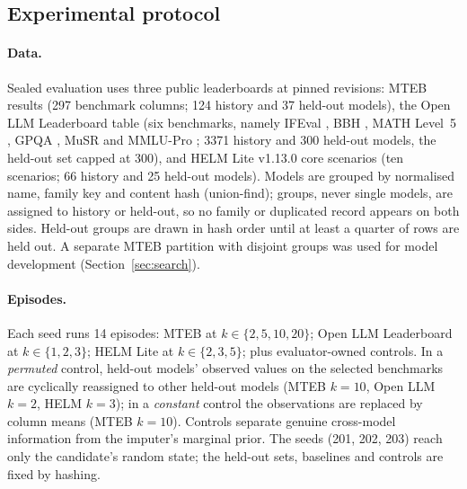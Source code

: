 \documentclass{article}
\begin{document}
\subsection{Experimental protocol}\label{sec:protocol}
\paragraph{Data.} Sealed evaluation uses three public leaderboards at pinned revisions: MTEB results (297 benchmark columns; 124 history and 37 held-out models), the Open LLM Leaderboard table (six benchmarks, namely IFEval \citep{Zhou2023IFEval}, BBH \citep{Suzgun2023BBH}, MATH Level~5 \citep{Hendrycks2021MATH}, GPQA \citep{Rein2023GPQA}, MuSR \citep{Sprague2023MuSR} and MMLU-Pro \citep{Wang2024MMLUPro}; 3371 history and 300 held-out models, the held-out set capped at 300), and HELM Lite v1.13.0 core scenarios (ten scenarios; 66 history and 25 held-out models). Models are grouped by normalised name, family key and content hash (union-find); groups, never single models, are assigned to history or held-out, so no family or duplicated record appears on both sides. Held-out groups are drawn in hash order until at least a quarter of rows are held out. A separate MTEB partition with disjoint groups was used for model development (Section~\ref{sec:search}).

\paragraph{Episodes.} Each seed runs 14 episodes: MTEB at $k\in\{2,5,10,20\}$; Open LLM Leaderboard at $k\in\{1,2,3\}$; HELM Lite at $k\in\{2,3,5\}$; plus evaluator-owned controls. In a \emph{permuted} control, held-out models' observed values on the selected benchmarks are cyclically reassigned to other held-out models (MTEB $k{=}10$, Open LLM $k{=}2$, HELM $k{=}3$); in a \emph{constant} control the observations are replaced by column means (MTEB $k{=}10$). Controls separate genuine cross-model information from the imputer's marginal prior. The seeds (201, 202, 203) reach only the candidate's random state; the held-out sets, baselines and controls are fixed by hashing.
\end{document}
